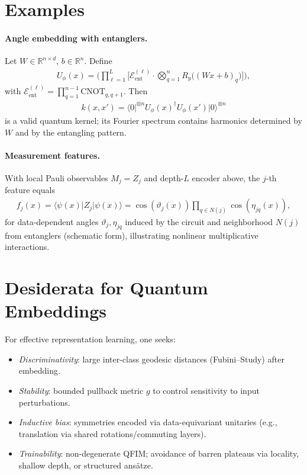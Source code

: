 \documentclass[11pt]{article}
\begin{document}
\section{Examples}

\paragraph{Angle embedding with entanglers.} Let \(W\in\mathbb{R}^{n\times d}\), \(b\in\mathbb{R}^n\). Define
\begin{align}
  U_\phi(x) 
  = \Big( \prod_{\ell=1}^L \Big[ \mathcal{E}_{\text{ent}}^{(\ell)} \cdot \bigotimes_{q=1}^n R_y\big((Wx+b)_q\big) \Big] \Big),
\end{align}
with \(\mathcal{E}_{\text{ent}}^{(\ell)} = \prod_{q=1}^{n-1} \mathrm{CNOT}_{q,q+1}\). Then
\begin{align}
  k(x,x') = \langle 0 \rvert^{\otimes n} U_\phi(x)^{\dagger} U_\phi(x') \lvert 0 \rangle^{\otimes n}
\end{align}
is a valid quantum kernel; its Fourier spectrum contains harmonics determined by \(W\) and by the entangling pattern.

\paragraph{Measurement features.} With local Pauli observables \(M_j=Z_j\) and depth-\(L\) encoder above, the \(j\)-th feature equals
\begin{align}
  f_j(x) = \langle \psi(x) \rvert Z_j \lvert \psi(x) \rangle = \cos(\vartheta_j(x))\prod_{q\in N(j)}\cos(\eta_{jq}(x)),
\end{align}
for data-dependent angles \(\vartheta_j,\eta_{jq}\) induced by the circuit and neighborhood \(N(j)\) from entanglers (schematic form), illustrating nonlinear multiplicative interactions.

\section{Desiderata for Quantum Embeddings}

For effective representation learning, one seeks:
\begin{itemize}
  \item \emph{Discriminativity}: large inter-class geodesic distances (Fubini--Study) after embedding.
  \item \emph{Stability}: bounded pullback metric \(g\) to control sensitivity to input perturbations.
  \item \emph{Inductive bias}: symmetries encoded via data-equivariant unitaries (e.g., translation via shared rotations/commuting layers).
  \item \emph{Trainability}: non-degenerate QFIM; avoidance of barren plateaus via locality, shallow depth, or structured ans\"atze.
\end{itemize}
\end{document}
